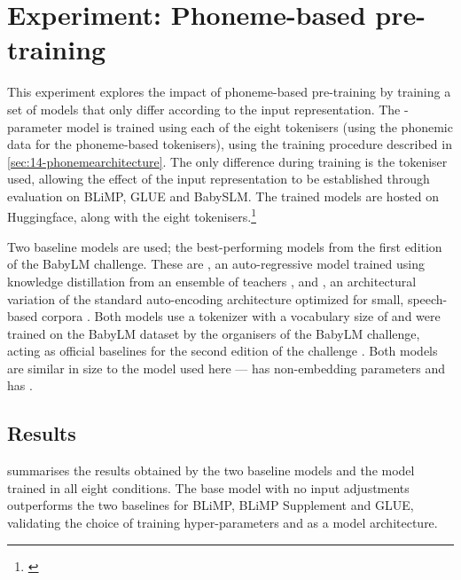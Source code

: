 \section{Experiment: Phoneme-based pre-training}

This experiment explores the impact of phoneme-based pre-training by training a set of models that only differ according to the input representation. The -parameter \gpt model is trained using each of the eight tokenisers (using the phonemic data for the phoneme-based tokenisers), using the training procedure described in \cref{sec:14-phonemearchitecture}. The only difference during training is the tokeniser used, allowing the effect of the input representation to be established through evaluation on BLiMP, GLUE and BabySLM. The trained models are hosted on Huggingface, along with the eight tokenisers.\footnote{\href{https://huggingface.co/collections/phonemetransformers/from-babble-to-words-66e068b54765a48ff30273c9}{}}

Two baseline models are used; the best-performing models from the first edition of the BabyLM challenge. These are , an auto-regressive model trained using knowledge distillation from an ensemble of teachers \citep{timiryasov-tastet-2023-baby}, and , an architectural variation of the standard auto-encoding \bert architecture optimized for small, speech-based corpora \citep{samuel-etal-2023-trained, charpentier-samuel-2023-layers}. Both models use a \bpe tokenizer with a vocabulary size of  and were trained on the BabyLM dataset by the organisers of the BabyLM challenge, acting as official baselines for the second edition of the challenge \citep{hu-etal-2024-findings}. Both models are similar in size to the \gpt model used here ---  has  non-embedding parameters and  has .

\subsection{Results}

 summarises the results obtained by the two baseline models and the \gpt model trained in all eight conditions. %
The base \gpt model with no input adjustments outperforms the two baselines for BLiMP, BLiMP Supplement and GLUE, validating the choice of training hyper-parameters and \gpt as a model architecture.

